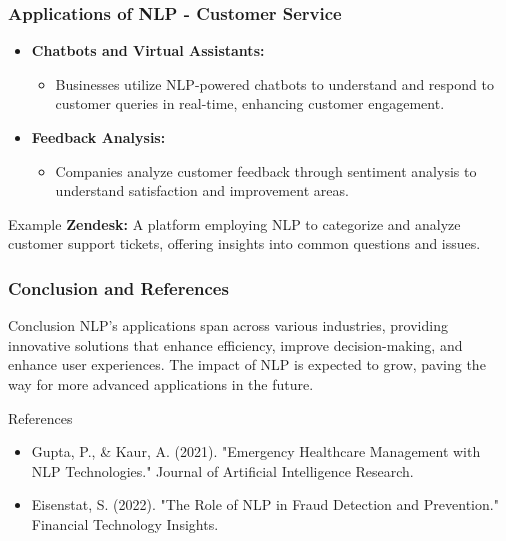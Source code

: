 \documentclass[aspectratio=169]{beamer}
\begin{document}
\begin{frame}[fragile]
    \frametitle{Applications of NLP - Customer Service}
    \begin{itemize}
        \item \textbf{Chatbots and Virtual Assistants:} 
            \begin{itemize}
                \item Businesses utilize NLP-powered chatbots to understand and respond to customer queries in real-time, enhancing customer engagement.
            \end{itemize}
        \item \textbf{Feedback Analysis:} 
            \begin{itemize}
                \item Companies analyze customer feedback through sentiment analysis to understand satisfaction and improvement areas.
            \end{itemize}
    \end{itemize}

    \begin{block}{Example}
        \textbf{Zendesk:} A platform employing NLP to categorize and analyze customer support tickets, offering insights into common questions and issues.
    \end{block}
\end{frame}

\begin{frame}[fragile]
    \frametitle{Conclusion and References}
    \begin{block}{Conclusion}
        NLP's applications span across various industries, providing innovative solutions that enhance efficiency, improve decision-making, and enhance user experiences. The impact of NLP is expected to grow, paving the way for more advanced applications in the future.
    \end{block}

    \begin{block}{References}
        \begin{itemize}
            \item Gupta, P., \& Kaur, A. (2021). "Emergency Healthcare Management with NLP Technologies." Journal of Artificial Intelligence Research.
            \item Eisenstat, S. (2022). "The Role of NLP in Fraud Detection and Prevention." Financial Technology Insights.
        \end{itemize}
    \end{block}
\end{frame}
\end{document}
